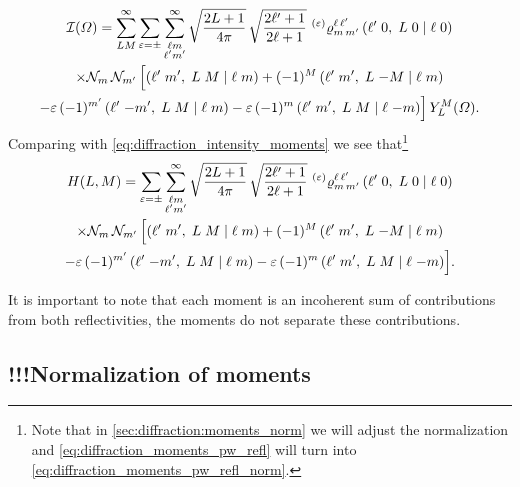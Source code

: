 \begin{multline}
  \mathcal{I}(\Omega)
  = \sum_{L M}^\infty \sum_{\varepsilon = \pm} \sum_{\substack{\ell m \\ \ell' m'}}^\infty
    \sqrt{\frac{2 L + 1}{4 \pi}}\, \sqrt{\frac{2 \ell' + 1}{2 \ell + 1}}\,
    \prescript{(\ensuremath{\varepsilon})}{}{\varrho}^{\ell\, \ell'}_{m\, m'}\, ({\ell'}\;{0},\;{L}\;{0}\; |\; {\ell}\;{0}) \\
    \times \mathcal{N}_m\, \mathcal{N}_{m'}\, \Big[
      ({\ell'}\;{m'},\;{L}\;{M}\; |\; {\ell}\;{m})
      + (-1)^M\, ({\ell'}\;{m'},\;{L}\;{-M}\; |\; {\ell}\;{m}) \\
      - \varepsilon\, (-1)^{m'}\, ({\ell'}\;{-m'},\;{L}\;{M}\; |\; {\ell}\;{m})
      - \varepsilon\, (-1)^m\, ({\ell'}\;{m'},\;{L}\;{M}\; |\; {\ell}\;{-m}) \Big]\,
    Y_L^M(\Omega).
\end{multline}
Comparing with \cref{eq:diffraction_intensity_moments} we see
that\footnote{Note that in \cref{sec:diffraction:moments_norm} we will
adjust the normalization and \cref{eq:diffraction_moments_pw_refl} will
turn into \cref{eq:diffraction_moments_pw_refl_norm}.}
\begin{multline}
  \label{eq:diffraction_moments_pw_refl}
  H(L, M)
  = \sum_{\varepsilon = \pm} \sum_{\substack{\ell m \\ \ell' m'}}^\infty
    \sqrt{\frac{2 L + 1}{4 \pi}}\, \sqrt{\frac{2 \ell' + 1}{2 \ell + 1}}\,
    \prescript{(\ensuremath{\varepsilon})}{}{\varrho}^{\ell\, \ell'}_{m\, m'}\, ({\ell'}\;{0},\;{L}\;{0}\; |\; {\ell}\;{0}) \\
    \times \mathcal{N}_m\, \mathcal{N}_{m'}\, \Big[
      ({\ell'}\;{m'},\;{L}\;{M}\; |\; {\ell}\;{m})
      + (-1)^M\, ({\ell'}\;{m'},\;{L}\;{-M}\; |\; {\ell}\;{m}) \\
      - \varepsilon\, (-1)^{m'}\, ({\ell'}\;{-m'},\;{L}\;{M}\; |\; {\ell}\;{m})
      - \varepsilon\, (-1)^m\, ({\ell'}\;{m'},\;{L}\;{M}\; |\; {\ell}\;{-m}) \Big].
\end{multline}

It is important to note that each moment is an incoherent
sum of contributions from both reflectivities, \ie the moments do not
separate these contributions.


\subsection{!!!Normalization of moments}%

